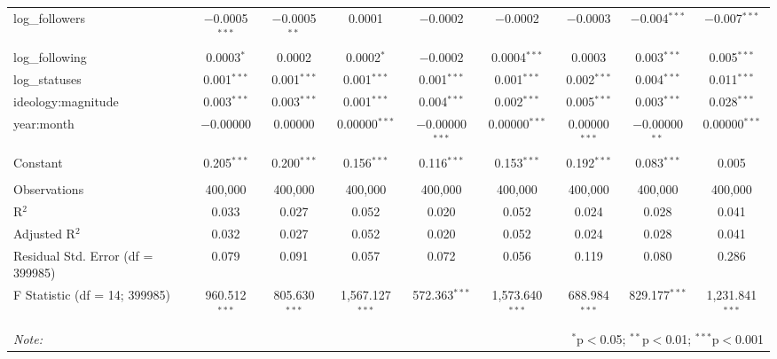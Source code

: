 \begin{table}[!htbp]
\begin{tabular}{@{\extracolsep{5pt}}lcccccccc}
  log\_followers & $-$0.0005$^{***}$ & $-$0.0005$^{**}$ & 0.0001 & $-$0.0002 & $-$0.0002 & $-$0.0003 & $-$0.004$^{***}$ & $-$0.007$^{***}$ \\ 
  log\_following & 0.0003$^{*}$ & 0.0002 & 0.0002$^{*}$ & $-$0.0002 & 0.0004$^{***}$ & 0.0003 & 0.003$^{***}$ & 0.005$^{***}$ \\ 
  log\_statuses & 0.001$^{***}$ & 0.001$^{***}$ & 0.001$^{***}$ & 0.001$^{***}$ & 0.001$^{***}$ & 0.002$^{***}$ & 0.004$^{***}$ & 0.011$^{***}$ \\ 
  ideology:magnitude & 0.003$^{***}$ & 0.003$^{***}$ & 0.001$^{***}$ & 0.004$^{***}$ & 0.002$^{***}$ & 0.005$^{***}$ & 0.003$^{***}$ & 0.028$^{***}$ \\ 
  year:month & $-$0.00000 & 0.00000 & 0.00000$^{***}$ & $-$0.00000$^{***}$ & 0.00000$^{***}$ & 0.00000$^{***}$ & $-$0.00000$^{**}$ & 0.00000$^{***}$ \\ 
  Constant & 0.205$^{***}$ & 0.200$^{***}$ & 0.156$^{***}$ & 0.116$^{***}$ & 0.153$^{***}$ & 0.192$^{***}$ & 0.083$^{***}$ & 0.005 \\ 
 \hline \\[-1.8ex] 
Observations & 400,000 & 400,000 & 400,000 & 400,000 & 400,000 & 400,000 & 400,000 & 400,000 \\ 
R$^{2}$ & 0.033 & 0.027 & 0.052 & 0.020 & 0.052 & 0.024 & 0.028 & 0.041 \\ 
Adjusted R$^{2}$ & 0.032 & 0.027 & 0.052 & 0.020 & 0.052 & 0.024 & 0.028 & 0.041 \\ 
Residual Std. Error (df = 399985) & 0.079 & 0.091 & 0.057 & 0.072 & 0.056 & 0.119 & 0.080 & 0.286 \\ 
F Statistic (df = 14; 399985) & 960.512$^{***}$ & 805.630$^{***}$ & 1,567.127$^{***}$ & 572.363$^{***}$ & 1,573.640$^{***}$ & 688.984$^{***}$ & 829.177$^{***}$ & 1,231.841$^{***}$ \\ 
\hline 
\hline \\[-1.8ex] 
\textit{Note:}  & \multicolumn{8}{r}{$^{*}$p$<$0.05; $^{**}$p$<$0.01; $^{***}$p$<$0.001} \\ 
\end{tabular} 
\end{table} 
